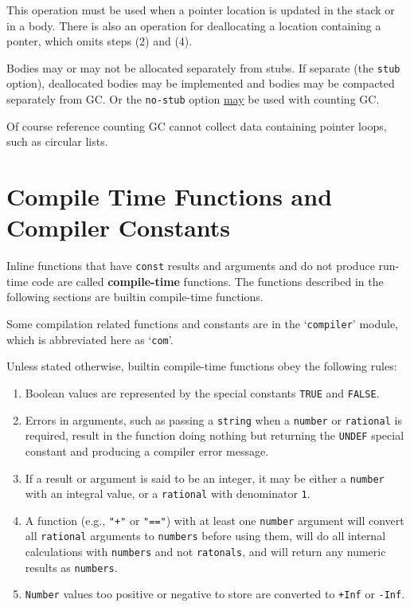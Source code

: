\documentclass[12pt]{article}
\newcommand{\key}[1]{{\rm \bfseries #1}}
\begin{document}
This operation must be used when a pointer location is updated
in the stack or in a body.  There is also an operation for
deallocating a location containing a ponter, which omits steps
(2) and (4).

Bodies may or may not be allocated separately from stubs.
If separate (the {\tt stub} option),
deallocated bodies may be implemented and
bodies may be compacted separately from GC.
Or the {\tt no-stub} option \underline{may} be used with
counting GC.

Of course reference counting GC cannot collect data containing
pointer loops, such as circular lists.

\section{Compile Time Functions and Compiler Constants}

Inline functions that have {\tt const} results and arguments
and do not produce run-time code are called \key{compile-time}
functions.  The functions described in the
following sections are builtin compile-time functions.

Some compilation related functions and
constants are in the `{\tt compiler}' module,
which is abbreviated here as `{\tt com}'.

Unless stated otherwise, builtin compile-time functions
obey the following rules:
\begin{enumerate}
\item
Boolean values are represented by the special constants
{\tt TRUE} and {\tt FALSE}.
\item
Errors in arguments, such as passing a {\tt string} when a
{\tt number} or {\tt rational} is required, result in the
function doing nothing but returning
the {\tt UNDEF} special constant and producing
a compiler error message.
\item
If a result or argument is said to be an integer, it may
be either a {\tt number} with an integral value, or a
{\tt rational} with denominator {\tt 1}.
\item
A function (e.g., {\tt "+"} or {\tt "=="})
with at least one {\tt number} argument will
convert all {\tt rational} arguments to {\tt numbers}
before using them, will do all internal calculations with
{\tt numbers} and not {\tt ratonals},
and will return any numeric results as {\tt numbers}.
\item
{\tt Number} values too positive or negative to store
are converted to {\tt +Inf} or {\tt -Inf}.
\end{enumerate}
\end{document}
